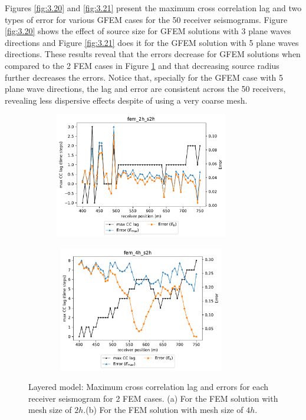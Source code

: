  Figures \ref{fig:3.20} and \ref{fig:3.21} present the maximum cross correlation lag and two types of error for various GFEM cases for the 50 receiver seismograms. Figure \ref{fig:3.20} shows the effect of source size for GFEM solutions with 3 plane waves directions and Figure \ref{fig:3.21} does it for the GFEM solution with 5 plane waves directions. These results reveal that the errors decrease for  GFEM solutions when compared to the 2 FEM cases in  Figure \ref{fig:3.19} and that decreasing source radius further decreases the errors. Notice that, specially for the GFEM case with 5 plane wave directions, the lag and error are consistent across the 50 receivers, revealing less dispersive effects despite of using a very coarse mesh.
 
 \begin{figure}[h!]
 		\centering
		\begin{subfigure}{8cm}
				\includegraphics[width=8cm, height=5.5cm]{Thesis_Edith/figures/layered_model/layer_waves/Err_fem_2h_s2h.pdf}
			     \caption{}
		\end{subfigure}
        \hspace{0.25cm}	
		\begin{subfigure}{8cm}
				\includegraphics[width=8cm, height=5.5cm]{Thesis_Edith/figures/layered_model/layer_waves/Err_fem_4h_s2h.pdf}
			   \caption{}
		\end{subfigure}
 
	\caption{Layered model: Maximum cross correlation lag and errors for each receiver seismogram for 2 FEM cases. (a) For the FEM solution with mesh size of $2h$.(b) For the FEM solution with mesh size of $4h$.}
	\label{fig:3.19}
\end{figure}

